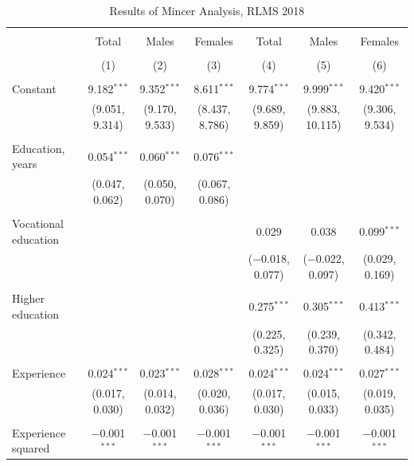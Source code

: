 \documentclass[alpha-refs]{wiley-article-01g}
\begin{document}
\begin{landscape}
	
	\fontsize{9}{11}
	\selectfont
	
	\begin{table}[!htbp] \centering 
\renewcommand{\arraystretch}{1.0}
		\caption{Results of Mincer Analysis, RLMS 2018} 
		\label{} 
		\begin{tabular}{@{\extracolsep{5pt}}lcccccc} 
			\\[-.8ex]\hline 
			\hline \\[-.8ex] 
			& Total & Males & Females & Total & Males & Females \\ 
			\\[-.8ex] & (1) & (2) & (3) & (4) & (5) & (6)\\ 
			\hline \\[-.8ex] 
			Constant & 9.182$^{***}$ & 9.352$^{***}$ & 8.611$^{***}$ & 9.774$^{***}$ & 9.999$^{***}$ & 9.420$^{***}$ \\ 
			& (9.051, 9.314) & (9.170, 9.533) & (8.437, 8.786) & (9.689, 9.859) & (9.883, 10.115) & (9.306, 9.534) \\ 
			& & & & & & \\ 
			Education, years & 0.054$^{***}$ & 0.060$^{***}$ & 0.076$^{***}$ &  &  &  \\ 
			& (0.047, 0.062) & (0.050, 0.070) & (0.067, 0.086) &  &  &  \\ 
			& & & & & & \\ 
			Vocational education &  &  &  & 0.029 & 0.038 & 0.099$^{***}$ \\ 
			&  &  &  & ($-$0.018, 0.077) & ($-$0.022, 0.097) & (0.029, 0.169) \\ 
			& & & & & & \\ 
			Higher education &  &  &  & 0.275$^{***}$ & 0.305$^{***}$ & 0.413$^{***}$ \\ 
			&  &  &  & (0.225, 0.325) & (0.239, 0.370) & (0.342, 0.484) \\ 
			& & & & & & \\ 
			Experience & 0.024$^{***}$ & 0.023$^{***}$ & 0.028$^{***}$ & 0.024$^{***}$ & 0.024$^{***}$ & 0.027$^{***}$ \\ 
			& (0.017, 0.030) & (0.014, 0.032) & (0.020, 0.036) & (0.017, 0.030) & (0.015, 0.033) & (0.019, 0.035) \\ 
			& & & & & & \\ 
			Experience squared & $-$0.001$^{***}$ & $-$0.001$^{***}$ & $-$0.001$^{***}$ & $-$0.001$^{***}$ & $-$0.001$^{***}$ & $-$0.001$^{***}$ \\ 

\end{tabular}
\end{table}
\end{landscape}
\end{document}
